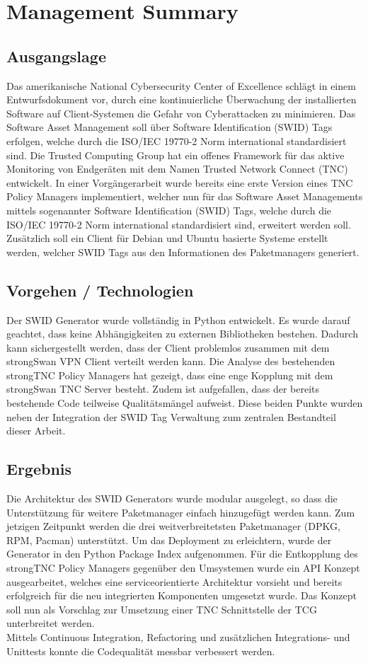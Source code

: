\chapter{Management Summary}

\section{Ausgangslage}
Das amerikanische National Cybersecurity Center of Excellence schlägt in einem
Entwurfsdokument  vor, durch eine kontinuierliche Überwachung der installierten
Software auf Client-Systemen die Gefahr von Cyberattacken zu minimieren. Das
Software  Asset Management soll über Software Identification (SWID) Tags
erfolgen, welche durch die ISO/IEC 19770-2\cite{iso19770-2} Norm international
standardisiert sind. Die Trusted Computing Group hat ein offenes Framework für
das aktive Monitoring von Endgeräten  mit dem Namen Trusted Network Connect
(TNC) entwickelt. In einer Vorgängerarbeit wurde bereits eine erste Version
eines TNC Policy Managers implementiert, welcher nun für das Software Asset
Managements mittels sogenannter Software Identification (SWID) Tags, welche
durch die ISO/IEC 19770-2 Norm international standardisiert sind,
erweitert werden soll. Zusätzlich soll ein Client für Debian und Ubuntu basierte
Systeme erstellt werden, welcher SWID Tags aus den Informationen des
Paketmanagers generiert.

\section{Vorgehen / Technologien}
Der SWID Generator wurde vollständig in Python entwickelt. Es wurde darauf
geachtet, dass keine Abhängigkeiten zu externen Bibliotheken bestehen. Dadurch
kann sichergestellt werden, dass der Client problemlos zusammen mit dem
strongSwan VPN Client verteilt werden kann. Die Analyse des bestehenden
strongTNC Policy Managers hat gezeigt, dass eine enge Kopplung mit dem
strongSwan TNC Server besteht. Zudem ist aufgefallen, dass der bereits bestehende Code
teilweise Qualitätsmängel aufweist. Diese beiden Punkte wurden neben der
Integration der SWID Tag Verwaltung zum zentralen Bestandteil dieser Arbeit.

\section{Ergebnis}
Die Architektur des SWID Generators wurde modular ausgelegt, so dass die
Unterstützung für weitere Paketmanager einfach hinzugefügt werden kann. Zum
jetzigen Zeitpunkt werden die drei weitverbreitetsten Paketmanager (DPKG,
RPM, Pacman) unterstützt. Um das Deployment zu erleichtern, wurde  der Generator
in den Python Package Index aufgenommen. Für die Entkopplung des strongTNC
Policy Managers gegenüber den Umsystemen wurde ein API Konzept ausgearbeitet,
welches eine serviceorientierte Architektur vorsieht und bereits erfolgreich für
die neu integrierten Komponenten umgesetzt wurde. Das Konzept soll nun als
Vorschlag zur Umsetzung einer TNC Schnittstelle der TCG unterbreitet werden.\\
Mittels Continuous Integration, Refactoring und zusätzlichen Integrations- und
Unittests konnte die Codequalität messbar verbessert werden.
